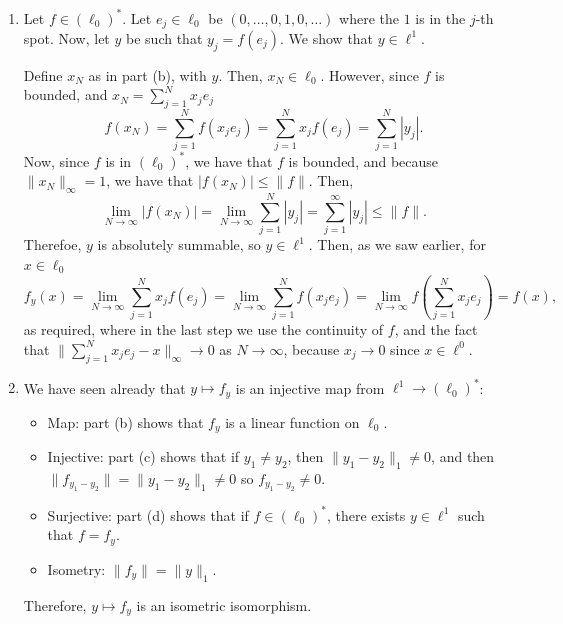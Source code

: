 \documentclass[11pt]{article}
\begin{document}
\begin{enumerate}[label=\arabic*., leftmargin=*, itemsep=10pt]
\begin{enumerate}
\[\begin{cases}
            1 &\text{ if } y_j = 0, j \leq N\\
            0 & \text{ else }
        \end{cases}
        .\]
        Then, by construction, $\|x_N\|_{\infty} = 1$, 
        \[
            |f_y(x_N)| = \sum_{j=1}^{N}|y_j|
        .\] 
        But then, since $\lim_{N \to \infty} |f_y(x_N)| = \|y\|_{1}$, we have that for all $\epsilon > 0$, there exists some $N$ such that $|f_y(x_N)| > \|y\|_{1} - \epsilon$.
        Therefore, $\|f_y\| = \sup \{|f_y(x)| : \|x\|_{\infty}\} \ge \|y\|_{1}$, so we deduce $\|f_y\| = \|y\|_{1}$.
    \item Let $f \in (\ell_{0})^{*}$. Let $e_j \in \ell_{0}$ be $(0, \ldots, 0, 1, 0, \ldots)$ where the $1$ is in the $j$-th spot.
        Now, let $y$ be such that $y_j = f(e_j)$.
        We show that $y \in \ell^{1}$.

        Define $x_N$ as in part (b), with $y$.
        Then, $x_N \in \ell_{0}$.
        However, since $f$ is bounded, and $x_N = \sum_{j = 1}^{N} x_j e_j$
        \[
        f(x_N) = \sum_{j=1}^{N} f(x_j e_j) = \sum_{j=1}^{N} x_j f(e_j) = \sum_{j=1}^{N} |y_j|
        .\] 
        Now, since $f$ is in $(\ell_{0})^{*}$, we have that $f$ is bounded, and because $\|x_N\|_{\infty} = 1$, we have that $|f(x_N)| \leq \|f\|$. Then,
        \[
        \lim_{N \to \infty} |f(x_N)| = \lim_{N \to \infty} \sum_{j = 1}^{N} |y_j| = \sum_{j=1}^{\infty} |y_j| \leq \|f\|
        .\] 
        Therefoe, $y$ is absolutely summable, so $y \in \ell^{1}$.
        Then, as we saw earlier, for $x \in \ell_{0}$
        \[
        f_y(x) = \lim_{N \to \infty} \sum_{j= 1}^{N} x_j f(e_j) =\lim_{N \to \infty} \sum_{j = 1}^{N} f(x_j e_j) = \lim_{N \to \infty} f \left(\sum_{j = 1}^{N} x_j e_j  \right) = f(x)
        ,\] 
        as required, where in the last step we use the continuity of $f$, and the fact that $\|\sum_{j = 1}^{N} x_j e_j - x \|_{\infty} \to 0$ as $N \to \infty$, because $x_j \to 0$ since $x \in \ell^{0}$.

    \item We have seen already that $y \mapsto f_y$ is an injective map from $\ell^{1} \to (\ell_{0})^{*}$: 
\begin{itemize}
    \item Map: part (b) shows that $f_y$ is a linear function on $\ell_{0}$.
    \item Injective: part (c) shows that if $y_1 \neq y_2$, then $\|y_1 - y_2\|_{1} \neq 0$, and then $\|f_{y_1 - y_2}\| = \|y_1 - y_2\|_{1} \neq 0$ so $f_{y_1 - y_2} \neq 0$.
    \item Surjective: part (d) shows that if $f \in (\ell_{0})^{*}$, there exists $y \in \ell^{1}$ such that $f = f_y$.
    \item Isometry: $\|f_y\| = \|y\|_{1}$.
\end{itemize}
Therefore, $y \mapsto f_y$ is an isometric isomorphism.
        \end{enumerate}



\end{enumerate}
\end{document}
